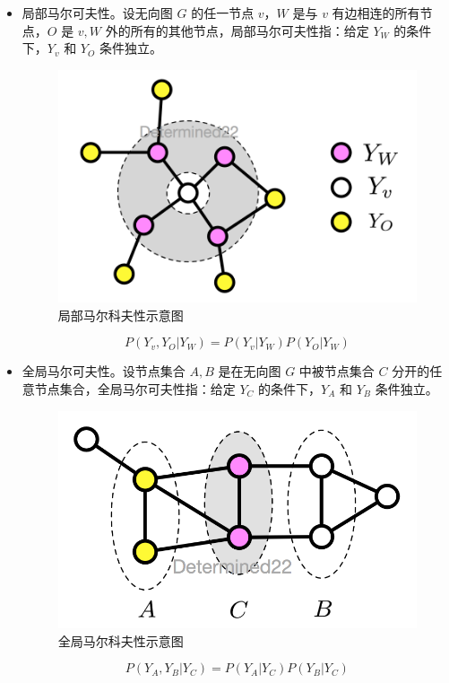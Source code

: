 \begin{itemize}
	\item 局部马尔可夫性。设无向图 $G$ 的任一节点 $v$，$W$ 是与 $v$ 有边相连的所有节点，$O$ 是 $v, W$ 外的所有的其他节点，局部马尔可夫性指：给定 $Y_W$ 的条件下，$Y_v$ 和 $Y_O$ 条件独立。
	\begin{figure}[ht]
		\centering
		\includegraphics[width=\linewidth/2]{figures/Markov2.png}
		\caption{局部马尔科夫性示意图}
    	\label{fig:Markov2}
	\end{figure}
	\begin{equation}
		P\left(Y_{v}, Y_{O} | Y_{W}\right)=P\left(Y_{v} | Y_{W}\right) P\left(Y_{O} | Y_{W}\right)
	\end{equation}
	
	\item 全局马尔可夫性。设节点集合 $A,B$ 是在无向图 $G$ 中被节点集合 $C$ 分开的任意节点集合，全局马尔可夫性指：给定 $Y_C$ 的条件下，$Y_A$ 和 $Y_B$ 条件独立。
	\begin{figure}[ht]
		\centering
		\includegraphics[width=\linewidth/2]{figures/Markov3.png}
		\caption{全局马尔科夫性示意图}
    	\label{fig:Markov3}
	\end{figure}
	\begin{equation}
		P\left(Y_{A}, Y_{B} | Y_{C}\right)=P\left(Y_{A} | Y_{C}\right) P\left(Y_{B} | Y_{C}\right)
	\end{equation}
\end{itemize}

